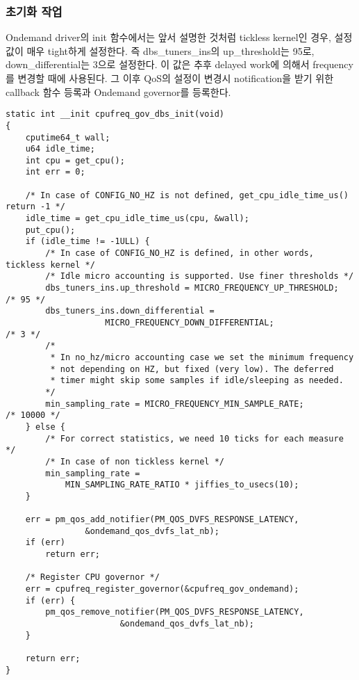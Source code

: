 \subsubsection{초기화 작업}
Ondemand driver의 init 함수에서는 앞서 설명한 것처럼 tickless kernel인 경우, 설정 값이 매우 tight하게 설정한다. 
즉 dbs\_tuners\_ins의 up\_threshold는 95로, down\_differential는 3으로 설정한다.
이 값은 추후 delayed work에 의해서 frequency를 변경할 때에 사용된다. 
그 이후 QoS의 설정이 변경시 notification을 받기 위한 callback 함수 등록과 
Ondemand governor를 등록한다. 

\begin{lstlisting}
static int __init cpufreq_gov_dbs_init(void)
{
    cputime64_t wall;
    u64 idle_time;
    int cpu = get_cpu();
    int err = 0;

    /* In case of CONFIG_NO_HZ is not defined, get_cpu_idle_time_us() return -1 */
    idle_time = get_cpu_idle_time_us(cpu, &wall);
    put_cpu();
    if (idle_time != -1ULL) {
        /* In case of CONFIG_NO_HZ is defined, in other words, tickless kernel */
        /* Idle micro accounting is supported. Use finer thresholds */
        dbs_tuners_ins.up_threshold = MICRO_FREQUENCY_UP_THRESHOLD;   /* 95 */
        dbs_tuners_ins.down_differential =
                    MICRO_FREQUENCY_DOWN_DIFFERENTIAL;                /* 3 */
        /*
         * In no_hz/micro accounting case we set the minimum frequency
         * not depending on HZ, but fixed (very low). The deferred
         * timer might skip some samples if idle/sleeping as needed.
        */
        min_sampling_rate = MICRO_FREQUENCY_MIN_SAMPLE_RATE;          /* 10000 */
    } else {
        /* For correct statistics, we need 10 ticks for each measure */
        /* In case of non tickless kernel */
        min_sampling_rate =
            MIN_SAMPLING_RATE_RATIO * jiffies_to_usecs(10);
    }

    err = pm_qos_add_notifier(PM_QOS_DVFS_RESPONSE_LATENCY,
                &ondemand_qos_dvfs_lat_nb);
    if (err)
        return err;

    /* Register CPU governor */
    err = cpufreq_register_governor(&cpufreq_gov_ondemand);
    if (err) {
        pm_qos_remove_notifier(PM_QOS_DVFS_RESPONSE_LATENCY,
                       &ondemand_qos_dvfs_lat_nb);
    }

    return err;
}
\end{lstlisting}

\vspace{\baselineskip}


